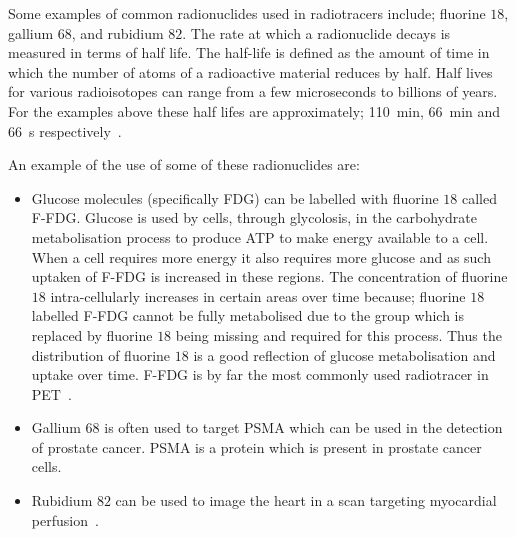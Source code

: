                 Some examples of common radionuclides used in radiotracers include; fluorine $18$, gallium $68$, and rubidium $82$. %
                The rate at which a radionuclide decays is measured in terms of half life. The half-life is defined as the amount of time in which the number of atoms of a radioactive material reduces by half. Half lives for various radioisotopes can range from a few microseconds to billions of years. For the examples above these half lifes are approximately; \SI{110}{\minute}, \SI{66}{\minute} and \SI{66}{\second} respectively~. %
                
                An example of the use of some of these radionuclides are:
                
                \begin{itemize}
                    \item Glucose molecules (specifically \gls{FDG}) can be labelled with fluorine $18$ called \gls{F-FDG}. %
                    Glucose is used by cells, through glycolosis, in the carbohydrate metabolisation process to produce \gls{ATP} to make energy available to a cell. When a cell requires more energy it also requires more glucose and as such uptaken of \gls{F-FDG} is increased in these regions. The concentration of fluorine $18$ intra-cellularly increases in certain areas over time because; fluorine $18$ labelled \gls{F-FDG} cannot be fully metabolised due to the group which is replaced by fluorine $18$ being missing and required for this process. Thus the distribution of fluorine $18$ is a good reflection of glucose metabolisation and uptake over time. \gls{F-FDG} is by far the most commonly used radiotracer in \gls{PET}~.
                    
                    \item Gallium $68$ is often used to target \gls{PSMA} which can be used in the detection of prostate cancer. \gls{PSMA} is a protein which is present in prostate cancer cells.
                    
                    \item Rubidium $82$ can be used to image the heart in a scan targeting myocardial perfusion~.
                \end{itemize}
            

